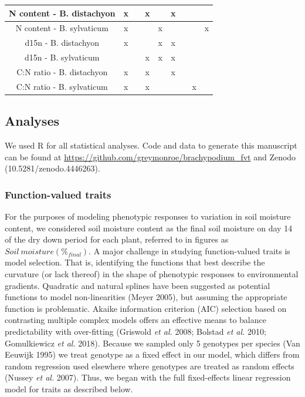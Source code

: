 \documentclass[jou,floatsintext]{apa6}
\begin{document}
\begin{table}[tbp]
\begin{center}
\begin{threeparttable}
{\begin{tabular}{ccccccccc}
N content - B. distachyon & x &  & x &  & x &  &  & \\ \midrule
N content - B. sylvaticum & x &  &  & x &  &  &  & x\\ \midrule
d15n - B. distachyon & x &  &  & x & x &  &  & \\ \midrule
d15n - B. sylvaticum &  &  & x & x & x &  &  & \\ \midrule
C:N ratio - B. distachyon & x &  & x &  & x &  &  & \\ \midrule
C:N ratio - B. sylvaticum & x &  & x &  &  &  & x & \\ \midrule
\bottomrule
\end{tabular}
}
\end{threeparttable}
\end{center}
\end{table}

\hypertarget{analyses}{%
\subsection{Analyses}\label{analyses}}

We used R for all statistical analyses. Code and data to generate this manuscript can be found at \url{https://github.com/greymonroe/brachypodium_fvt} and Zenodo (10.5281/zenodo.4446263).

\hypertarget{function-valued-traits}{%
\subsubsection{Function-valued traits}\label{function-valued-traits}}

For the purposes of modeling phenotypic responses to variation in soil moisture content, we considered soil moisture content as the final soil moisture on day 14 of the dry down period for each plant, referred to in figures as \(Soil\ moisture (\%_{final})\). A major challenge in studying function-valued traits is model selection. That is, identifying the functions that best describe the curvature (or lack thereof) in the shape of phenotypic responses to environmental gradients. Quadratic and natural splines have been suggested as potential functions to model non-linearities (Meyer 2005), but assuming the appropriate function is problematic. Akaike information criterion (AIC) selection based on contrasting multiple complex models offers an effective means to balance predictability with over-fitting (Griswold \emph{et al.} 2008; Bolstad \emph{et al.} 2010; Gomulkiewicz \emph{et al.} 2018). Because we sampled only 5 genotypes per species (Van Eeuwijk 1995) we treat genotype as a fixed effect in our model, which differs from random regression used elsewhere where genotypes are treated as random effects (Nussey \emph{et al.} 2007). Thus, we began with the full fixed-effects linear regression model for traits as described below.
\end{document}
